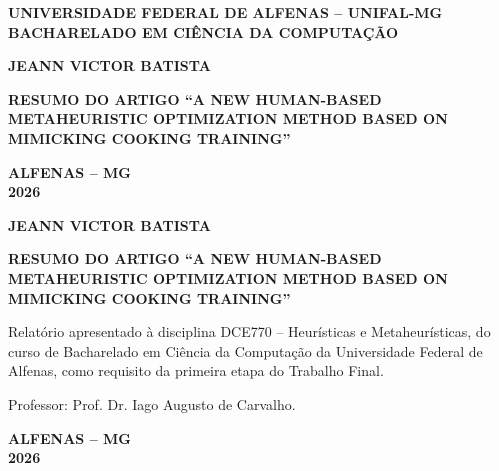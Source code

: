 \documentclass[12pt,a4paper]{article}
\begin{document}
\hypersetup{pageanchor=false}

\begin{titlepage}
    \begin{center}
        \textbf{UNIVERSIDADE FEDERAL DE ALFENAS -- UNIFAL-MG}\\
        \textbf{BACHARELADO EM CIÊNCIA DA COMPUTAÇÃO}

        \vspace*{5cm}

        \textbf{JEANN VICTOR BATISTA}

        \vfill

        \textbf{RESUMO DO ARTIGO ``A NEW HUMAN-BASED METAHEURISTIC
        OPTIMIZATION METHOD BASED ON MIMICKING COOKING TRAINING''}

        \vfill

        \textbf{ALFENAS -- MG}\\
        \textbf{2026}
    \end{center}
\end{titlepage}

\begin{titlepage}
    \begin{center}
        \textbf{JEANN VICTOR BATISTA}

        \vspace*{5cm}

        \textbf{RESUMO DO ARTIGO ``A NEW HUMAN-BASED METAHEURISTIC
        OPTIMIZATION METHOD BASED ON MIMICKING COOKING TRAINING''}
    \end{center}

    \vspace*{3cm}

    \hfill
    \begin{minipage}{0.55\textwidth}
        \singlespacing
        Relatório apresentado à disciplina DCE770 -- Heurísticas e
        Metaheurísticas, do curso de Bacharelado em Ciência da Computação da
        Universidade Federal de Alfenas, como requisito da primeira etapa do
        Trabalho Final.

        \vspace{\baselineskip}

        Professor: Prof. Dr. Iago Augusto de Carvalho.
    \end{minipage}

    \vfill

    \begin{center}
        \textbf{ALFENAS -- MG}\\
        \textbf{2026}
    \end{center}
\end{titlepage}
\end{document}
